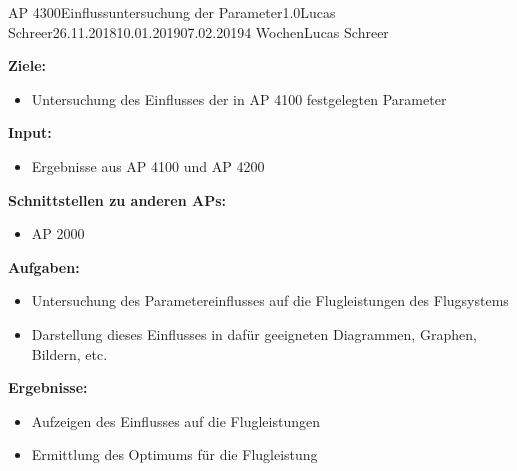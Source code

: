 \clearpage
\begin{wpd}{AP 4300}{Einflussuntersuchung der Parameter}{1.0}{Lucas Schreer}{26.11.2018}{10.01.2019}{07.02.2019}{4 Wochen}{Lucas Schreer}
    {
    \textbf{Ziele:}
    \begin{itemize}
        \item Untersuchung des Einflusses der in AP 4100 festgelegten Parameter
    \end{itemize}
    \textbf{Input:}
    \begin{itemize}
        \item Ergebnisse aus AP 4100 und AP 4200
    \end{itemize}
    \textbf{Schnittstellen zu anderen APs:}
    \begin{itemize}
        \item AP 2000
    \end{itemize}
    \textbf{Aufgaben:}
    \begin{itemize}
        \item Untersuchung des Parametereinflusses auf die Flugleistungen des Flugsystems
        \item Darstellung dieses Einflusses in dafür geeigneten Diagrammen, Graphen, Bildern, etc.
    \end{itemize}
    \textbf{Ergebnisse:}
    \begin{itemize}
        \item Aufzeigen des Einflusses auf die Flugleistungen
        \item Ermittlung des Optimums für die Flugleistung
    \end{itemize}
    }
\end{wpd}


